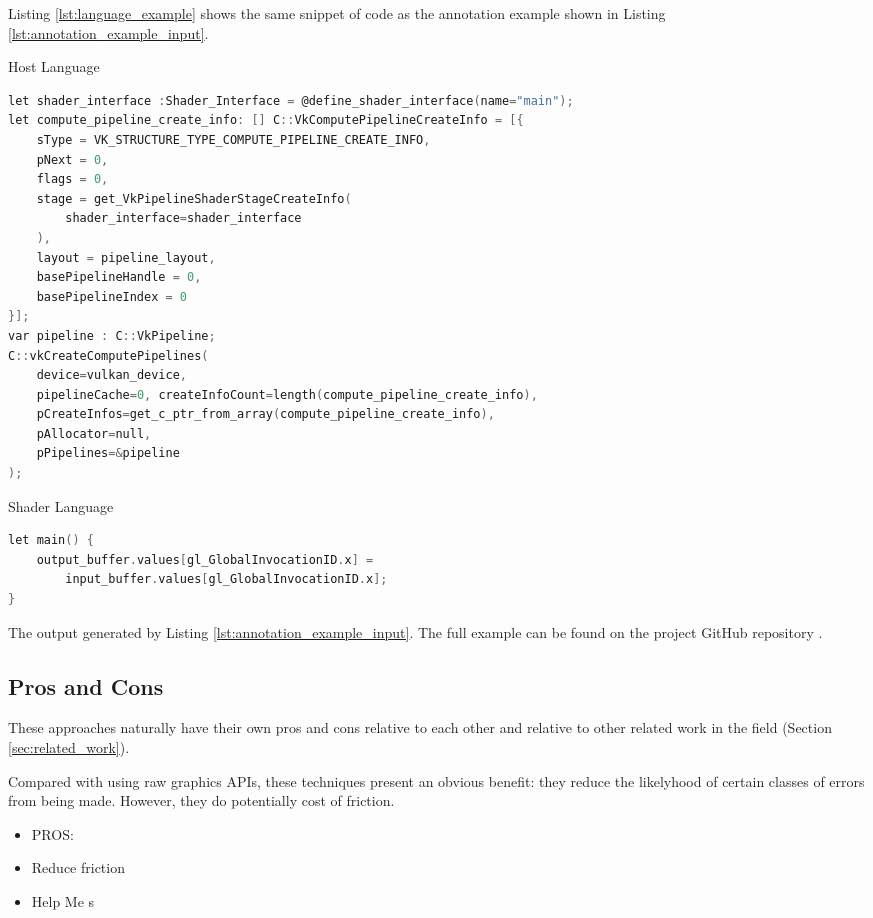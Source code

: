 \documentclass[a4paper,12pt,twoside,openright]{report}
\begin{document}
Listing \ref{lst:language_example} shows the same snippet of code as the
annotation example shown in Listing \ref{lst:annotation_example_input}.

\begin{lstfloat}
\begin{center} Host Language \end{center}
\begin{lstlisting}[language=C]
let shader_interface :Shader_Interface = @define_shader_interface(name="main");
let compute_pipeline_create_info: [] C::VkComputePipelineCreateInfo = [{
    sType = VK_STRUCTURE_TYPE_COMPUTE_PIPELINE_CREATE_INFO,
    pNext = 0,
    flags = 0,
    stage = get_VkPipelineShaderStageCreateInfo(
        shader_interface=shader_interface
    ),
    layout = pipeline_layout,
    basePipelineHandle = 0,
    basePipelineIndex = 0
}];
var pipeline : C::VkPipeline;
C::vkCreateComputePipelines(
    device=vulkan_device,
    pipelineCache=0, createInfoCount=length(compute_pipeline_create_info),
    pCreateInfos=get_c_ptr_from_array(compute_pipeline_create_info),
    pAllocator=null,
    pPipelines=&pipeline
);
\end{lstlisting}
\begin{center}
Shader Language
\end{center}
\begin{lstlisting}[language=C]
let main() {
    output_buffer.values[gl_GlobalInvocationID.x] =
        input_buffer.values[gl_GlobalInvocationID.x];
}
\end{lstlisting}
\caption{The output generated by Listing \ref{lst:annotation_example_input}. The full
example can be found on the project GitHub repository \cite{ProjectSource}.}
\label{lst:language_example}
\end{lstfloat}


\subsection{Pros and Cons}

These approaches naturally have their own pros and cons relative to each other
and relative to other related work in the field (Section
\ref{sec:related_work}).

Compared with using raw graphics APIs, these techniques present an obvious
benefit: they reduce the likelyhood of certain classes of errors from being
made. However, they do potentially cost of friction.

\begin{itemize}

    \item PROS:

        \item Reduce friction

        \item Help Me s

\end{itemize}
\end{document}
